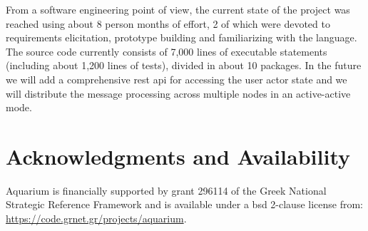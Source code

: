 \documentclass[letterpaper,twocolumn,10pt]{article}
\begin{document}
From a software engineering point of view, the current state of the
project was reached using about 8 person months of effort, 2 of which
were devoted to requirements elicitation, prototype building and
familiarizing with the language. The source code currently consists of
7,000 lines of executable statements (including about 1,200 lines of
tests), divided in about 10 packages. In the future we will add a
comprehensive {\sc rest api} for accessing the user actor state and we
will distribute the message processing across multiple nodes in an
active-active mode.

\section{Acknowledgments and Availability}

Aquarium is financially supported by grant 296114 of the Greek
National Strategic Reference Framework and is available under a {\sc
  bsd} 2-clause license from:
\url{https://code.grnet.gr/projects/aquarium}.

{\footnotesize 
}
\end{document}
